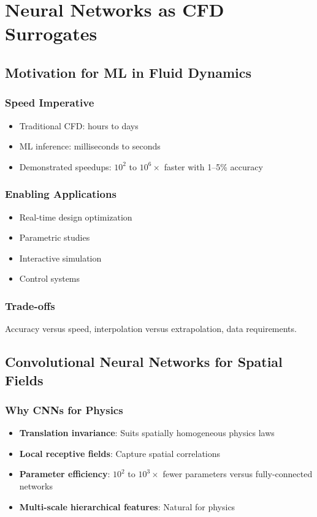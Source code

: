 \chapter{Neural Networks as CFD Surrogates}

\section{Motivation for ML in Fluid Dynamics}

\subsection{Speed Imperative}
\begin{itemize}
    \item Traditional CFD: hours to days
    \item ML inference: milliseconds to seconds
    \item Demonstrated speedups: $10^2$ to $10^6\times$ faster with 1--5\% accuracy
\end{itemize}

\subsection{Enabling Applications}
\begin{itemize}
    \item Real-time design optimization
    \item Parametric studies
    \item Interactive simulation
    \item Control systems
\end{itemize}

\subsection{Trade-offs}
Accuracy versus speed, interpolation versus extrapolation, data requirements.

\section{Convolutional Neural Networks for Spatial Fields}

\subsection{Why CNNs for Physics}
\begin{itemize}
    \item \textbf{Translation invariance}: Suits spatially homogeneous physics laws
    \item \textbf{Local receptive fields}: Capture spatial correlations
    \item \textbf{Parameter efficiency}: $10^2$ to $10^3\times$ fewer parameters versus fully-connected networks
    \item \textbf{Multi-scale hierarchical features}: Natural for physics
\end{itemize}

